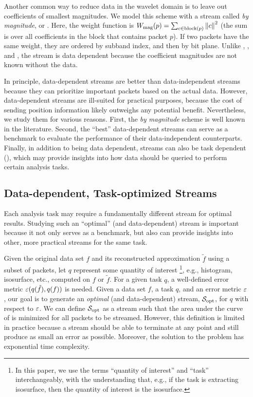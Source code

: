 Another common way to reduce data in the wavelet domain is to leave out coefficients of smallest
magnitudes. We model this scheme with a stream called \emph{by magnitude}, or \smag. Here, the
weight function is $\wmag(p)=\sum_{c\in \text{block}(p)}\norm{c}^2$ (the sum is over all
coefficients in the block that contains packet $p$). If two packets have the same weight, they are
ordered by subband index, and then by bit plane. Unlike \slvl, \sbit, and \swav, the \smag stream is
data dependent because the coefficient magnitudes are not known without the data.

In principle, data-dependent streams are better than data-independent streams because they can
prioritize important packets based on the actual data. However, data-dependent streams are
ill-suited for practical purposes, because the cost of sending position information likely outweighs
any potential benefit. Nevertheless, we study them for various reasons. First, the \emph{by
magnitude} scheme is well known in the literature. Second, the ``best'' data-dependent streams can
serve as a benchmark to evaluate the performance of their data-independent counterparts. Finally, in
addition to being data dependent, streams can also be task dependent (),
which may provide insights into how data should be queried to perform certain analysis tasks.

\subsection{Data-dependent, Task-optimized Streams} \label{sec:data_dep_streams}

Each analysis task may require a fundamentally different stream for optimal results. Studying such
an ``optimal'' (and data-dependent) stream is important because it not only serves as a benchmark,
but also can provide insights into other, more practical streams for the same task.

Given the original data set $f$ and its reconstructed approximation $\tilde{f}$ using a subset of
packets, let $q$ represent some quantity of interest \footnote{In this paper, we use the terms
``quantity of interest'' and ``task'' interchangeably, with the understanding that, e.g., if the
task is extracting isosurface, then the quantity of interest is the isosurface.}, e.g., histogram,
isosurface, etc., computed on $f$ or $\tilde{f}$. For a given task $q$, a well-defined error metric
$\err(q(\tilde{f}),q(f))$ is needed. Given a data set $f$, a task $q$, and an error metric $\err$,
our goal is to generate an \emph{optimal} (and data-dependent) stream, $\sopt$, for $q$ with respect
to $\err$. We can define $\sopt$ as a stream such that the area under the curve of \err is minimized
for all packets to be streamed. However, this definition is limited in practice because a stream
should be able to terminate at any point and still produce as small an error as possible. Moreover,
the solution to the problem has exponential time complexity.

